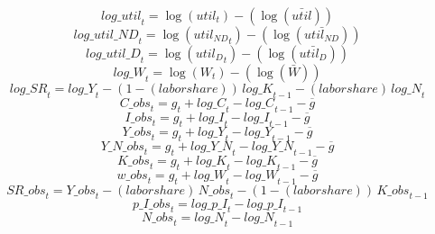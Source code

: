 \begin{dmath}
{log\_util}_{t}=\log\left({{util}}_{t}\right)-(\log\left(\bar{{util}}\right))
\end{dmath}
\begin{dmath}
{log\_util\_ND}_{t}=\log\left({{util_{ND}}}_{t}\right)-(\log\left(\bar{{util_{ND}}}\right))
\end{dmath}
\begin{dmath}
{log\_util\_D}_{t}=\log\left({{util_D}}_{t}\right)-(\log\left(\bar{{util_D}}\right))
\end{dmath}
\begin{dmath}
{log\_W}_{t}=\log\left({{W}}_{t}\right)-(\log\left(\bar{{W}}\right))
\end{dmath}
\begin{dmath}
{log\_SR}_{t}={log\_Y}_{t}-\left(1-{(labor share)}\right)\, {log\_K}_{t-1}-{(labor share)}\, {log\_N}_{t}
\end{dmath}
\begin{dmath}
{C\_obs}_{t}={{g}}_{t}+{log\_C}_{t}-{log\_C}_{t-1}-{{\overline{g}}}
\end{dmath}
\begin{dmath}
{I\_obs}_{t}={{g}}_{t}+{log\_I}_{t}-{log\_I}_{t-1}-{{\overline{g}}}
\end{dmath}
\begin{dmath}
{Y\_obs}_{t}={{g}}_{t}+{log\_Y}_{t}-{log\_Y}_{t-1}-{{\overline{g}}}
\end{dmath}
\begin{dmath}
{Y\_N\_obs}_{t}={{g}}_{t}+{log\_Y\_N}_{t}-{log\_Y\_N}_{t-1}-{{\overline{g}}}
\end{dmath}
\begin{dmath}
{K\_obs}_{t}={{g}}_{t}+{log\_K}_{t}-{log\_K}_{t-1}-{{\overline{g}}}
\end{dmath}
\begin{dmath}
{w\_obs}_{t}={{g}}_{t}+{log\_W}_{t}-{log\_W}_{t-1}-{{\overline{g}}}
\end{dmath}
\begin{dmath}
{SR\_obs}_{t}={Y\_obs}_{t}-{(labor share)}\, {N\_obs}_{t}-\left(1-{(labor share)}\right)\, {K\_obs}_{t-1}
\end{dmath}
\begin{dmath}
{p\_I\_obs}_{t}={log\_p\_I}_{t}-{log\_p\_I}_{t-1}
\end{dmath}
\begin{dmath}
{N\_obs}_{t}={log\_N}_{t}-{log\_N}_{t-1}
\end{dmath}
